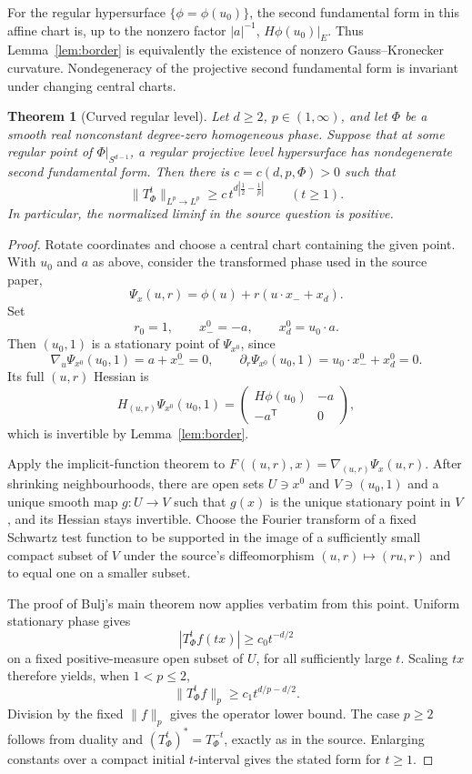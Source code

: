 \documentclass[11pt]{amsart}
\newtheorem{theorem}{Theorem}
\theoremstyle{remark}
\begin{document}
For the regular hypersurface $\{\phi=\phi(u_0)\}$, the second fundamental
form in this affine chart is, up to the nonzero factor $|a|^{-1}$,
$H\phi(u_0)|_E$.  Thus Lemma~\ref{lem:border} is equivalently the existence of
nonzero Gauss--Kronecker curvature.  Nondegeneracy of the projective second
fundamental form is invariant under changing central charts.

\begin{theorem}[Curved regular level]\label{thm:curved}
Let $d\ge2$, $p\in(1,\infty)$, and let $\Phi$ be a smooth real nonconstant
degree-zero homogeneous phase.  Suppose that at some regular point of
$\Phi|_{S^{d-1}}$, a regular projective level hypersurface has nondegenerate
second fundamental form.  Then there is $c=c(d,p,\Phi)>0$ such that
\[
 \|T_\Phi^t\|_{L^p\to L^p}
 \ge c\,t^{d|\frac12-\frac1p|}
 \qquad(t\ge1).
\]
In particular, the normalized liminf in the source question is positive.
\end{theorem}

\begin{proof}
Rotate coordinates and choose a central chart containing the given point.
With $u_0$ and $a$ as above, consider the transformed phase used in the source
paper,
\[
 \Psi_x(u,r)=\phi(u)+r(u\cdot x_-+x_d).
\]
Set
\[
 r_0=1,\qquad x_-^0=-a,\qquad x_d^0=u_0\cdot a.
\]
Then $(u_0,1)$ is a stationary point of $\Psi_{x^0}$, since
\[
 \nabla_u\Psi_{x^0}(u_0,1)=a+x_-^0=0,
 \qquad
 \partial_r\Psi_{x^0}(u_0,1)=u_0\cdot x_-^0+x_d^0=0.
\]
Its full $(u,r)$ Hessian is
\[
 H_{(u,r)}\Psi_{x^0}(u_0,1)=
 \begin{pmatrix}H\phi(u_0)&-a\\-a^{\mathsf T}&0\end{pmatrix},
\]
which is invertible by Lemma~\ref{lem:border}.

Apply the implicit-function theorem to
$F((u,r),x)=\nabla_{(u,r)}\Psi_x(u,r)$.  After shrinking neighbourhoods, there
are open sets $U\ni x^0$ and $V\ni(u_0,1)$ and a unique smooth map
$g:U\to V$ such that $g(x)$ is the unique stationary point in $V$, and its
Hessian stays invertible.  Choose the Fourier transform of a fixed Schwartz
test function to be supported in the image of a sufficiently small compact
subset of $V$ under the source's diffeomorphism
$(u,r)\mapsto(ru,r)$ and to equal one on a smaller subset.

The proof of Bulj's main theorem now applies verbatim from this point.  Uniform
stationary phase gives
\[
 |T_\Phi^t f(tx)|\ge c_0t^{-d/2}
\]
on a fixed positive-measure open subset of $U$, for all sufficiently large
$t$.  Scaling $tx$ therefore yields, when $1<p\le2$,
\[
 \|T_\Phi^t f\|_p\ge c_1t^{d/p-d/2}.
\]
Division by the fixed $\|f\|_p$ gives the operator lower bound.  The case
$p\ge2$ follows from duality and
$(T_\Phi^t)^*=T_\Phi^{-t}$, exactly as in the source.  Enlarging constants over
a compact initial $t$-interval gives the stated form for $t\ge1$.
\end{proof}
\end{document}
